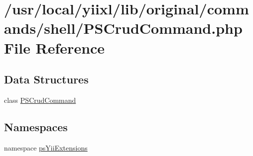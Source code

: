 \hypertarget{PSCrudCommand_8php}{
\section{/usr/local/yiixl/lib/original/commands/shell/PSCrudCommand.php File Reference}
\label{PSCrudCommand_8php}
}
\subsection*{Data Structures}
\begin{DoxyCompactItemize}
\item 
class \hyperlink{classPSCrudCommand}{PSCrudCommand}
\end{DoxyCompactItemize}
\subsection*{Namespaces}
\begin{DoxyCompactItemize}
\item 
namespace \hyperlink{namespacepsYiiExtensions}{psYiiExtensions}
\end{DoxyCompactItemize}
